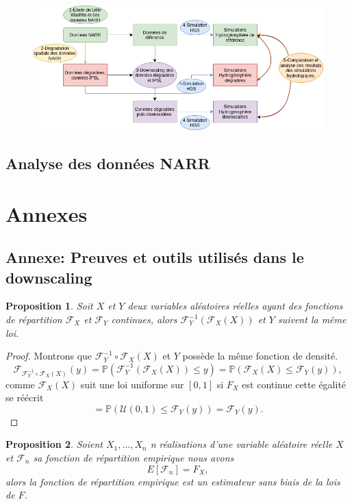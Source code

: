 \documentclass[a4paper,11pt]{article}
\numberwithin{equation}{section}
\newtheorem{proposition}{Proposition}
\begin{document}
\begin{figure}[h]
	\begin{center}
		\includegraphics[scale=0.6]{Diagrame_methodo.png}
	\end{center}
	\label{fig:methodo}
\end{figure}

\subsection{Analyse des données NARR}


















\newpage
\section{Annexes}

\subsection{Annexe: Preuves et outils utilisés dans le downscaling}
\label{ch:outils-mathematiques}
\begin{proposition}
	Soit $X$ et $Y$ deux variables aléatoires réelles ayant des fonctions de répartition $\mathcal{F}_{X}$ et $\mathcal{F}_{Y}$ continues, alors 
	$\mathcal{F}^{-1}_Y (\mathcal{F}_X(X))$ et $Y$ suivent la même loi. 
\end{proposition}
\begin{proof}
	Montrons que $\mathcal{F}^{-1}_Y \circ \mathcal{F}_X(X)$ et $Y$ possède la même fonction de densité. 
	\[\mathcal{F}_{\mathcal{F}^{-1}_Y \circ \mathcal{F}_X(X)}(y)
	= \mathbb{P}(\mathcal{F}^{-1}_Y (\mathcal{F}_X(X))\leq y )
	= \mathbb{P}(\mathcal{F}_{X}(X) \leq \mathcal{F}_Y(y)),\]
	comme $\mathcal{F}_{X}(X)$ suit une loi uniforme sur $[0,1]$ si $F_X$ est continue cette égalité se réécrit
	\[= \mathbb{P}(\mathcal{U}(0,1) \leq \mathcal{F}_Y(y))=\mathcal{F}_Y(y).\]
\end{proof}
\begin{proposition}
	\label{mean-rep-emp}
	Soient $X_1,...,X_n$ n réalisations d'une variable aléatoire réelle $X$ et $\mathcal{F}_{n}$ sa fonction de répartition empirique nous avons
	\[E[\mathcal{F}_n]=F_{X},\]
	alors la fonction de répartition empirique est un estimateur sans biais de la lois de $F$. 
\end{proposition}
\end{document}
